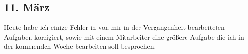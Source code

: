 \subsection{11. März}
Heute habe ich einige Fehler in von mir in der Vergangenheit bearbeiteten Aufgaben korrigiert, sowie mit einem Mitarbeiter eine größere Aufgabe die ich in der kommenden Woche bearbeiten soll besprochen.